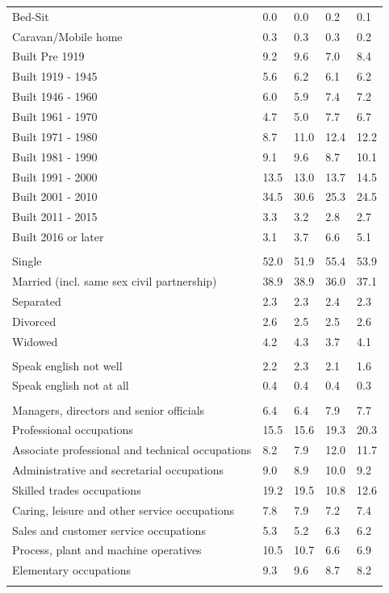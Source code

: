 \documentclass{article}
\begin{document}
\begin{table}[h]
\begin{tabular}{KTTTT}
Bed-Sit & 0.0& 0.0& 0.2& 0.1\\
Caravan/Mobile home & 0.3& 0.3& 0.3& 0.2\\
    \hline
Built Pre 1919 & 9.2& 9.6& 7.0& 8.4\\
Built 1919 - 1945 & 5.6& 6.2& 6.1& 6.2\\
Built  1946 - 1960 & 6.0& 5.9& 7.4& 7.2\\
Built  1961 - 1970 & 4.7& 5.0& 7.7& 6.7\\
Built  1971 - 1980 &  8.7& 11.0& 12.4& 12.2\\
Built  1981 - 1990 &  9.1&  9.6&  8.7& 10.1\\
Built  1991 - 2000 & 13.5& 13.0& 13.7& 14.5\\
Built  2001 - 2010 & 34.5& 30.6& 25.3& 24.5\\
Built  2011 - 2015 & 3.3& 3.2& 2.8& 2.7\\
Built  2016 or later & 3.1& 3.7& 6.6& 5.1\\
\hline
    \\
    \hline
Single & 52.0& 51.9& 55.4& 53.9\\
Married (incl. same sex civil partnership) & 38.9& 38.9& 36.0& 37.1\\
Separated  & 2.3& 2.3& 2.4& 2.3\\
Divorced  & 2.6& 2.5& 2.5& 2.6\\
Widowed & 4.2& 4.3& 3.7& 4.1\\
\hline
    \\ 
    \hline
Speak english not well & 2.2& 2.3& 2.1& 1.6\\
Speak english not at all & 0.4& 0.4& 0.4& 0.3\\
\hline
    \\
    \hline
Managers, directors and senior officials & 6.4& 6.4& 7.9& 7.7\\
Professional occupations & 15.5& 15.6& 19.3& 20.3\\
Associate professional and technical occupations &  8.2&  7.9& 12.0& 11.7\\
Administrative and secretarial occupations &  9.0&  8.9& 10.0&  9.2\\
Skilled trades occupations & 19.2& 19.5& 10.8& 12.6\\
Caring, leisure and other service occupations & 7.8& 7.9& 7.2& 7.4\\
Sales and customer service occupations & 5.3& 5.2& 6.3& 6.2\\
Process, plant and machine operatives & 10.5& 10.7&  6.6&  6.9\\
Elementary occupations & 9.3& 9.6& 8.7& 8.2\\
\hline
\end{tabular}
\end{table}
\end{document}
